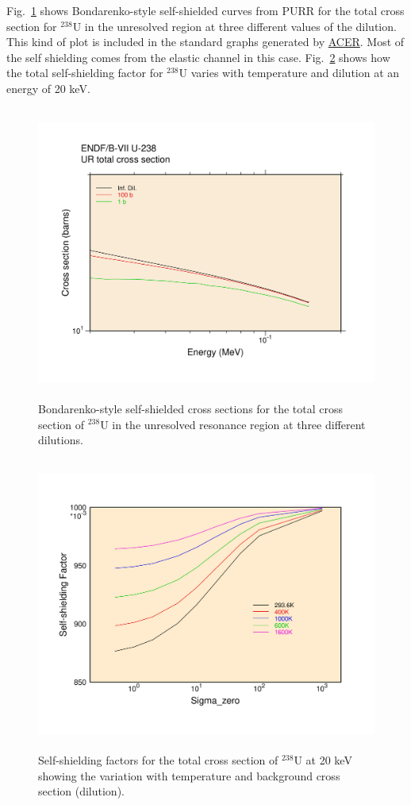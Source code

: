 Fig.~\ref{u238ss} shows Bondarenko-style self-shielded curves
from PURR for the total cross section for $^{238}$U in the unresolved
region at three different values of the dilution.  This kind of plot
is included in the standard graphs generated by
\hyperlink{sACERhy}{ACER}.  Most
of the self shielding comes from the elastic channel in this case.
Fig.~\ref{u238sf} shows how the total self-shielding factor for
$^{238}$U varies with temperature and dilution at an energy of 20 keV.

\begin{figure}[t]\centering
\includegraphics[keepaspectratio, height=3.8in, angle=0]{figs/u238ssack}
\caption[Bondarenko-style self-shielding]{Bondarenko-style self-shielded
 cross sections for the total cross section of $^{238}$U in the unresolved
 resonance region at three different dilutions.}
\label{u238ss}
\end{figure}

\begin{figure}[t]\centering
\includegraphics[keepaspectratio, height=3.8in, angle=0]{figs/u238sfack}
\caption[Self-shielding variation with temperature and dilution]{Self-shielding
 factors for the total cross section of $^{238}$U at 20 keV
 showing the variation with temperature and background
 cross section (dilution).}
\label{u238sf}
\end{figure}

